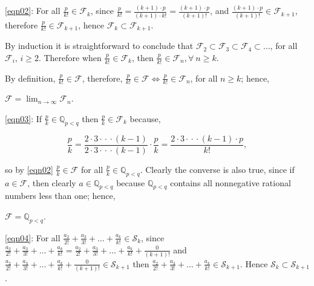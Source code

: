 \documentclass{article}
\begin{document}
\break
\eqref{eqn02}:
For all \(\frac{p}{k!} \in \mathcal{F}_k\),
since \(\frac{p}{k!} = \frac{(k+1)\cdot{}p}{(k+1)\cdot{}k!} = \frac{(k+1)\cdot{}p}{(k+1)!}\),
and \(\frac{(k+1)\cdot{}p}{(k+1)!} \in \mathcal{F}_{k+1}\),
therefore \(\frac{p}{k!} \in \mathcal{F}_{k+1}\),
hence \(\mathcal{F}_k \subset \mathcal{F}_{k+1}\).

By induction it is straightforward to conclude that
\(\mathcal{F}_2
\subset \mathcal{F}_3
\subset \mathcal{F}_4
\subset \dots{}
\), for all \(\mathcal{F}_i\), \(i \ge{} 2\). Therefore when
\(\frac{p}{k!} \in \mathcal{F}_k\), then \(\frac{p}{k!} \in \mathcal{F}_n, \forall\ n \ge{} k\).

By definition, \(\frac{p}{k!} \in \mathcal{F}\),
therefore, \(\frac{p}{k!} \in \mathcal{F} \Leftrightarrow \frac{p}{k!}
\in \mathcal{F}_n\), for all \(n \ge k\);
hence,
\begin{center}
\(\displaystyle{\mathcal{F} = \lim_{n \to \infty}\mathcal{F}_n}\).
\end{center}

\bigskip
\eqref{eqn03}:
If \(\frac{p}{k} \in \mathbb{Q}_{p<q}\)
then \(\frac{p}{k} \in{} \mathcal{F}_k\) because,

{\small
\bgroup                                  %
\setlength{\abovedisplayskip}{0pt}       %
\begin{equation*}
\frac{p}{k}
= \frac{2\cdot{}3\cdot{}\cdot{}\cdot{}(k-1)}{2\cdot{}3\cdot{}\cdot{}\cdot{}(k-1)} \cdot{} \frac{p}{k}
= \frac{2\cdot{}3\cdot{}\cdot{}\cdot{}(k-1)\cdot{}p}{k!},
\end{equation*}
\egroup
}

so by \eqref{eqn02} \(\frac{p}{k} \in \mathcal{F}\)
for all \(\frac{p}{k} \in \mathbb{Q}_{p<q}\). Clearly the converse is also
true, since if \(a \in \mathcal{F}\), then clearly \(a \in \mathbb{Q}_{p<q}\)
because \(\mathbb{Q}_{p<q}\) contains all nonnegative rational numbers less than one;
hence,
\begin{center}
\(\mathcal{F} = \mathbb{Q}_{p<q}\).
\end{center}

\bigskip
\eqref{eqn04}:
For all \(\frac{a_2}{2!} + \frac{a_3}{3!} + \dots{} + \frac{a_k}{k!} \in \mathcal{S}_k\),
since
\(\frac{a_2}{2!} + \frac{a_3}{3!} + \dots{} + \frac{a_k}{k!} =
\frac{a_2}{2!} + \frac{a_3}{3!} + \dots{} + \frac{a_k}{k!} + \frac{0}{(k+1)!}\)
and
\(\frac{a_2}{2!} + \frac{a_3}{3!} + \dots{} + \frac{a_k}{k!} + \frac{0}{(k+1)!}
\in \mathcal{S}_{k+1}\) then 
\(\frac{a_2}{2!} + \frac{a_3}{3!} + \dots{} + \frac{a_k}{k!}
\in \mathcal{S}_{k+1}\). Hence 
\(\mathcal{S}_k \subset \mathcal{S}_{k+1}\).
\end{document}
